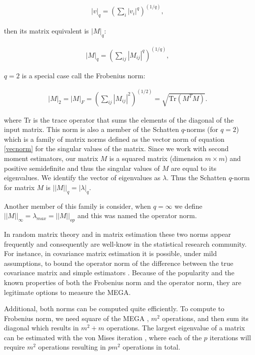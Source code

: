 \documentclass{article}
\begin{document}
\begin{align}
|v|_q = (\sum_i |v_i|^q)^{(1/q)},
\label{vecnorm}
\end{align}

then its matrix equivalent is $|M|_q$:

\begin{align}
|M|_q = (\sum_{ij} |M_{ij}|^q)^{(1/q)},
\label{matnorm}
\end{align}

$q=2$ is a special case call the Frobenius norm:

\begin{align}
|M|_2 = |M|_F = (\sum_{ij} |M_{ij}|^2)^{(1/2)} = \sqrt{\text{Tr}(M^TM)}.
\label{Frobe}
\end{align}

where Tr is the trace operator that sums the elements of the diagonal of the input matrix. This norm is also a member of the Schatten $q$-norms (for $q=2$) which is a family of matrix norms defined as the vector norm of equation \ref{vecnorm} for the singular values of the matrix. Since we work with second moment estimators, our matrix $M$ is a squared matrix (dimension $m \times m$) and positive semidefinite and thus the singular values of $M$ are equal to its eigenvalues.  We identify the vector of eigenvalues as $\lambda$. Thus the  Schatten $q$-norm for matrix $M$ is $||M||_q=|\lambda|_q$. 

\bigskip

Another member of this family is consider, when $q=\infty$ we define $||M||_\infty = \lambda_{max} = ||M||_{op}$ and this was named the operator norm.

\bigskip

In random matrix theory and in matrix estimation these two norms appear frequently and consequently are well-know in the statistical research community. For instance, in covariance matrix estimation it is possible, under mild assumptions, to bound the operator norm of the difference between the true covariance matrix and simple estimators \cite{rigollet15}. Because of the popularity and the known properties of both the Frobenius norm and the operator norm, they are legitimate options to measure the MEGA. 

\bigskip

Additional, both norms can be computed quite efficiently. To compute to Frobenius norm, we need square of the MEGA , $m^2$ operations, and then sum its diagonal which results in $m^2+m$ operations. The largest eigenvalue of a matrix can be estimated with the von Mises iteration \cite{mises29}, where each of the $p$ iterations will require $m^2$ operations resulting in $pm^2$ operations in total.
\end{document}
